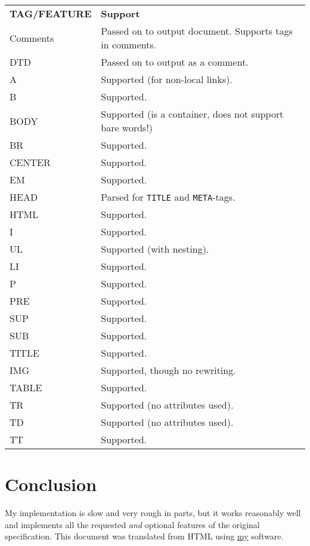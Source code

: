 \documentclass[a4paper,10pt]{article}
\begin{document}
\begin{tabular}{ll}
\textbf{TAG/FEATURE} & \textbf{Support} \\
Comments & Passed on to output document. Supports tags in comments. \\
DTD & Passed on to output as a comment. \\
A & Supported (for non-local links). \\
B & Supported. \\
BODY & Supported (is a container, does not support bare words!) \\
BR & Supported. \\
CENTER & Supported. \\
EM & Supported. \\
HEAD & Parsed for \texttt{TITLE} and \texttt{META}-tags. \\
HTML & Supported. \\
I & Supported. \\
UL & Supported (with nesting). \\
LI & Supported. \\
P & Supported. \\
PRE & Supported. \\
SUP & Supported. \\
SUB & Supported. \\
TITLE & Supported. \\
IMG & Supported, though no rewriting. \\
TABLE & Supported. \\
TR & Supported (no attributes used). \\
TD & Supported (no attributes used). \\
TT & Supported. \\
\end{tabular}

\section{Conclusion}



My implementation is slow and very rough in parts, but it works reasonably well
 and implements all the requested \emph{and} optional features of the original
 specification. This document was translated from HTML using \href{http://gazonk.org/~eloj/}{my} software.
\end{document}
